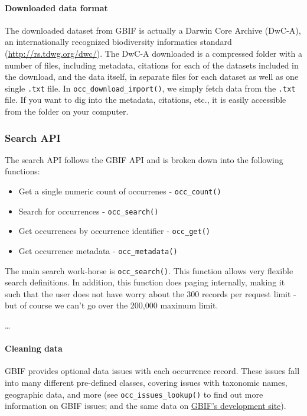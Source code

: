 \documentclass[author-year, review, 11pt]{components/elsarticle} %
\begin{document}
\paragraph{Downloaded data format}\label{downloaded-data-format}

The downloaded dataset from GBIF is actually a Darwin Core Archive
(DwC-A), an internationally recognized biodiversity informatics standard
(\url{http://rs.tdwg.org/dwc/}). The DwC-A downloaded is a compressed
folder with a number of files, including metadata, citations for each of
the datasets included in the download, and the data itself, in separate
files for each dataset as well as one single \texttt{.txt} file. In
\texttt{occ\_download\_import()}, we simply fetch data from the
\texttt{.txt} file. If you want to dig into the metadata, citations,
etc., it is easily accessible from the folder on your computer.

\subsubsection{Search API}\label{search-api}

The search API follows the GBIF API and is broken down into the
following functions:

\begin{itemize}
\itemsep1pt\parskip0pt
\item
  Get a single numeric count of occurrenes - \texttt{occ\_count()}
\item
  Search for occurrences - \texttt{occ\_search()}
\item
  Get occurrences by occurrence identifier - \texttt{occ\_get()}
\item
  Get occurrence metadata - \texttt{occ\_metadata()}
\end{itemize}

The main search work-horse is \texttt{occ\_search()}. This function
allows very flexible search definitions. In addition, this function does
paging internally, making it such that the user does not have worry
about the 300 records per request limit - but of course we can't go over
the 200,000 maximum limit.

\ldots{}

\paragraph{Cleaning data}\label{cleaning-data}

GBIF provides optional data issues with each occurrence record. These
issues fall into many different pre-defined classes, covering issues
with taxonomic names, geographic data, and more (see
\texttt{occ\_issues\_lookup()} to find out more information on GBIF
issues; and the same data on
\href{http://gbif.github.io/gbif-api/apidocs/org/gbif/api/vocabulary/OccurrenceIssue.html}{GBIF's
development site}).
\end{document}
